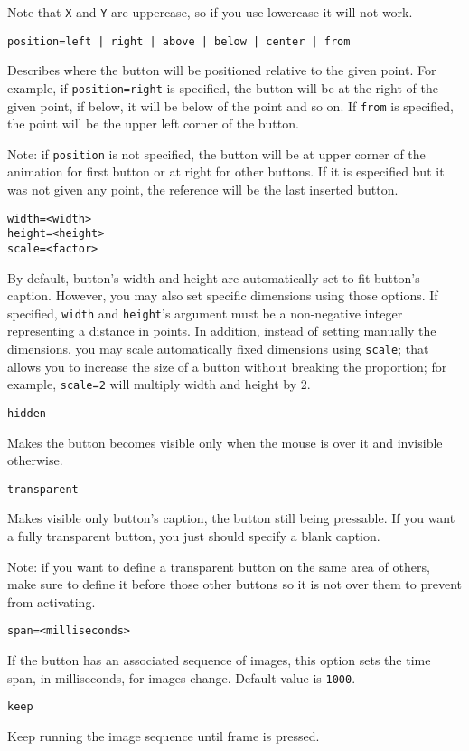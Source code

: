 \documentclass[a4paper,12pt]{article}
\begin{document}
Note that \verb+X+ and \verb+Y+ are uppercase, so if you use lowercase it will not work.
\begin{verbatim}
position=left | right | above | below | center | from
\end{verbatim}
Describes where the button will be positioned relative to the given point. For example, if \verb+position=right+ is specified, the button will be at the right of the given point, if below, it will be below of the point and so on. If \verb+from+ is specified, the point will be the upper left corner of the button.

Note: if \verb+position+ is not specified, the button will be at upper corner of the animation for first button or at right for other buttons. If it is especified but it was not given any point, the reference will be the last inserted button.

\begin{verbatim}
width=<width>
height=<height>
scale=<factor>
\end{verbatim}
By default, button's width and height are automatically set to fit button's caption. However, you may also set specific dimensions using those options. If specified, \verb+width+ and \verb+height+'s argument must be a non-negative integer representing a distance in points. In addition, instead of setting manually the dimensions, you may scale automatically fixed dimensions using \verb+scale+; that allows you to increase the size of a button without breaking the proportion; for example, \verb+scale=2+ will multiply width and height by 2.
\medskip
\begin{verbatim}
hidden
\end{verbatim}
Makes the button becomes visible only when the mouse is over it and invisible otherwise.
\begin{verbatim}
transparent
\end{verbatim}
Makes visible only button's caption, the button still being pressable. If you want a fully transparent button, you just should specify a blank caption.

Note: if you want to define a transparent button on the same area of others, make sure to define it before those other buttons so it is not over them to prevent from activating.
\begin{verbatim}
span=<milliseconds>
\end{verbatim}
If the button has an associated sequence of images, this option sets the time span, in milliseconds, for images change. Default value is \verb+1000+.
\begin{verbatim}
keep
\end{verbatim}
Keep running the image sequence until frame is pressed.
\end{document}
